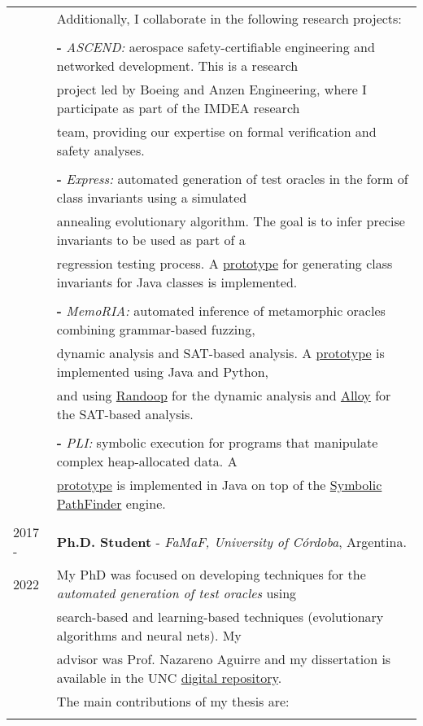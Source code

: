 \documentclass[a4paper,10pt]{article} %
\begin{document}
\begin{longtable}{ll}
& Additionally, I collaborate in the following research projects: \\ & \\

& \textbf{-} \textit{ASCEND:} aerospace safety-certifiable engineering and networked development. This is a research  
\\ 
& project led by Boeing and Anzen Engineering, where I participate as part of the IMDEA research  \\ 
& team, providing our expertise on formal verification and safety analyses. \\ & \\

& \textbf{-} \textit{Express:} automated generation of test oracles in the form of class invariants using a simulated \\ 
& annealing evolutionary algorithm. The goal is to infer precise invariants to be used as part of a \\ 
&  regression testing process. A \href{https://github.com/JuanmaCopia/express}{prototype} for 
generating class invariants for Java classes is implemented. \\ & \\

& \textbf{-} \textit{MemoRIA:} automated inference of metamorphic oracles combining grammar-based fuzzing, \\
& dynamic analysis and SAT-based analysis. A \href{https://zenodo.org/records/10683011}{prototype} is implemented using Java and Python, \\ 
& and using \href{https://randoop.github.io/randoop/}{Randoop} for the dynamic analysis and \href{https://alloytools.org/}{Alloy} for the SAT-based analysis. \\ & \\

& \textbf{-} \textit{PLI:} symbolic execution for programs that manipulate complex heap-allocated data. A \\ 
& \href{https://github.com/JuanmaCopia/spf-pli}{prototype} is implemented in Java on top of the \href{https://github.com/SymbolicPathFinder/jpf-symbc}{Symbolic PathFinder} engine. \\ & \\

2017 - & \textbf{Ph.D. Student} - \textit{FaMaF, University of Córdoba}, Argentina. \\ 
2022 & My PhD was focused on developing techniques for the \textit{automated generation of test oracles} using \\
& search-based and learning-based techniques (evolutionary algorithms and neural nets). My \\
& advisor was Prof. Nazareno Aguirre and my dissertation is available in the UNC \href{https://rdu.unc.edu.ar/handle/11086/26692}{digital repository}. \\ 
& The main contributions of my thesis are: \\ & \\


\end{longtable}
\end{document}
